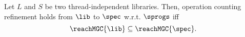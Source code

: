 \begin{corollary}\label{th:mgc_count}
Let $L$ and $S$ be two thread-independent libraries. %
Then, operation counting refinement holds from $\lib$ to $\spec$ w.r.t. $\sprogs$ iff
\[
\reachMGC{\lib}\subseteq 
\reachMGC{\spec}.
\]
\end{corollary}













